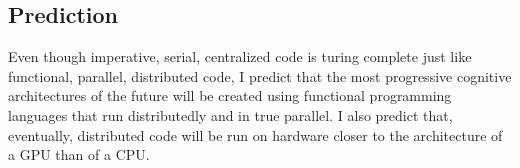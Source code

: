 \documentclass[a4paper]{article}
\begin{document}
    \subsection{Prediction}

        Even though imperative, serial, centralized code is turing complete just like functional, parallel, distributed code, I predict that the most progressive cognitive architectures of the future will be created using functional programming languages that run distributedly and in true parallel. 
        I also predict that, eventually, distributed code will be run on hardware closer to the architecture of a GPU than of a CPU.

\printbibliography
\end{document}
